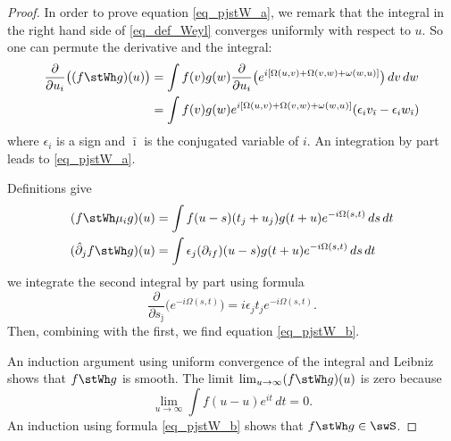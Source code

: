 \begin{proof}
	In order to prove equation \eqref{eq_pjstW_a}, we remark that the integral in the right hand side of \eqref{eq_def_Weyl} converges uniformly with respect to $u$. So one can permute the derivative and the integral:
	\[
		\begin{split}
			\frac{ \partial }{ \partial u_i }\big( (f\stWh g)(u) \big)&=\int f(v)g(w)\frac{ \partial }{ \partial u_i }\big( e^{i[\Omega(u,v)+\Omega(v,w)+\omega(w,u)]} \big)\,dv\,dw\\
			&=\int f(v)g(w)e^{i[\Omega(u,v)+\Omega(v,w)+\omega(w,u)]}(\epsilon_i v_{\bar\imath}-\epsilon_i w_{\bar\imath})
		\end{split}
	\]
	where $\epsilon_i$ is a sign and $\bar\imath$ is the conjugated variable of $i$. An integration by part leads to \eqref{eq_pjstW_a}.

	Definitions give
	\begin{subequations}
		\begin{align}
			(f\stWh \mu_ig)(u)          & =\int f(u-s)(t_j+u_j)g(t+u)e^{-i\Omega(s,t)}\,ds\,dt                          \\
			(\hat\partial_jf\stWh g)(u) & =\int \epsilon_j(\partial_{\bar\imath f})(u-s)g(t+u)e^{-i\Omega(s,t)}\,ds\,dt
		\end{align}
	\end{subequations}
	we integrate the second integral by part using formula
	\[
		\frac{ \partial }{ \partial s_{\bar\jmath} }\big( e^{-i\Omega(s,t)} \big)=i\epsilon_jt_je^{-i\Omega(s,t)}.
	\]
	Then, combining with the first, we find equation \eqref{eq_pjstW_b}.

	An induction argument using uniform convergence of the integral and Leibniz shows that $f\stWh g$ is smooth. The limit $\lim_{u\to\infty}(f\stWh g)(u)$ is zero because
	\[
		\lim_{u\to\infty}\int f(u-u)e^{it}\,dt=0.
	\]
	An induction using formula  \eqref{eq_pjstW_b} shows that $f\stWh g\in\swS$.


\end{proof}
